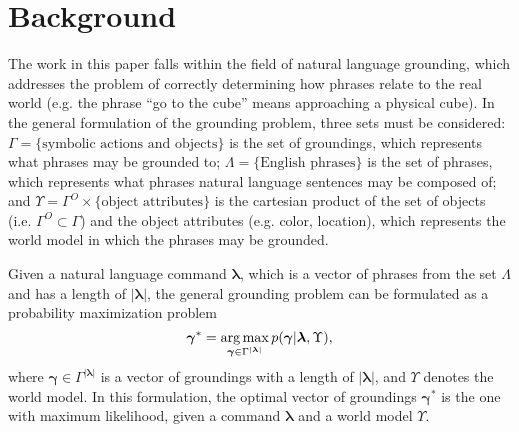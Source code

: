 \section{Background}
\label{sec:background}
The work in this paper falls within the field of natural language grounding, which addresses the problem of correctly determining how phrases relate to the real world (e.g. the phrase ``go to the cube'' means approaching a physical cube).
In the general formulation of the grounding problem, three sets must be considered: ${\Gamma = \{\text{symbolic actions and objects\}}}$ is the set of groundings, which represents what phrases may be grounded to; ${\Lambda = \{\text{English phrases}\}}$ is the set of phrases, which represents what phrases natural language sentences may be composed of; and ${\Upsilon = \Gamma^O \times \{\text{object attributes}\} }$ is the cartesian product of the set of objects (i.e. $\Gamma^O \subset \Gamma$) and the object attributes (e.g. color, location), which represents the world model in which the phrases may be grounded. 

Given a natural language command $\boldsymbol{\lambda}$, which is a vector of phrases from the set $\Lambda$ and has a length of $|\boldsymbol{\lambda}|$, 
the general grounding problem can be formulated as a probability maximization problem%
\begin{equation}
\boldsymbol{\gamma}^* = \operatorname*{\arg\max}_{\boldsymbol{\gamma} \in \Gamma^{|\boldsymbol{\lambda}|}} p(\boldsymbol{\gamma}|\boldsymbol{\lambda},\Upsilon),
\label{eq:max_ground_prob}
\end{equation}
where $\boldsymbol{\gamma} \in \Gamma^{|\boldsymbol{\lambda}|}$ is a vector of groundings with a length of $|\boldsymbol{\lambda}|$, and $\Upsilon$ denotes the world model. 
In this formulation, the optimal vector of groundings $\boldsymbol{\gamma}^*$ is the one with maximum likelihood, given a command $\boldsymbol{\lambda}$ and a world model $\Upsilon$.

